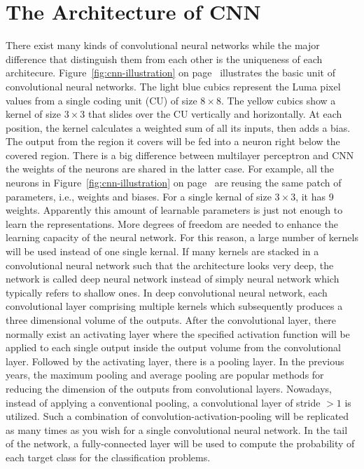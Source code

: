 \section{The Architecture of CNN}\label{sec:cnn}
There exist many kinds of convolutional neural networks while the 
major difference that distinguish them from each other
is the uniqueness of each architecure.
Figure~\ref{fig:cnn-illustration} on 
page~\pageref{fig:cnn-illustration}
illustrates the basic unit
of convolutional neural networks.
The light blue cubics represent the Luma pixel values from a single
coding unit (CU) of size \(8\times8\).
The yellow cubics show a kernel of size \(3\times3\) that 
slides over the
CU vertically and horizontally.
At each position, the kernel calculates a weighted sum of all its inputs,
then adds a bias.
The output from the
region it covers will be fed into a neuron right
below the covered region.
There is a big difference between multilayer perceptron and 
CNN\: the weights of the neurons are shared in the latter case.
For example, all the neurons in Figure~\ref{fig:cnn-illustration} on
page~\pageref{fig:cnn-illustration} are reusing the same patch of
parameters, i.e., weights and biases.
For a single kernal of size \(3\times3\), it has 9 weights.
Apparently this amount of learnable parameters is just not enough
to learn the representations.
More degrees of freedom are needed to enhance
the learning capacity of the neural network.
For this reason, a large number of kernels will be used 
instead of one single kernal.
If many kernels are stacked in a convolutional neural network such that
the architecture looks very deep, the network is called deep neural network
instead of simply neural network which typically refers to shallow ones.
In deep convolutional neural network,
each convolutional layer comprising multiple kernels which subsequently produces
a three dimensional volume of the outputs.
After the convolutional layer, there normally exist an activating layer where
the specified activation function will be applied to each single output
inside the output volume from the convolutional layer.
Followed by the activating layer, there is a pooling layer.
In the previous years, the maximum pooling and average pooling 
are popular methods for reducing the dimension of the outputs
from convolutional layers.
Nowadays, instead of applying a conventional pooling, 
a convolutional layer of stride \(> 1\) is utilized.
Such a combination of convolution-activation-pooling will
be replicated as many times as you wish for a 
single convolutional neural network.
In the tail of the network, a fully-connected layer will be used
to compute the probability of each target class for the 
classification problems.

